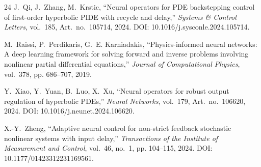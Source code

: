 \documentclass[11pt]{article}
\begin{document}
\begin{thebibliography}{24}
J.~Qi, J.~Zhang, M.~Krstic,
``Neural operators for PDE backstepping control of first-order hyperbolic
PIDE with recycle and delay,''
\emph{Systems \& Control Letters}, vol.~185, Art.\ no.\ 105714, 2024.
DOI: 10.1016/j.sysconle.2024.105714.

M.~Raissi, P.~Perdikaris, G.~E. Karniadakis,
``Physics-informed neural networks: A deep learning framework for solving
forward and inverse problems involving nonlinear partial differential
equations,''
\emph{Journal of Computational Physics}, vol.~378, pp. 686--707, 2019.

Y.~Xiao, Y.~Yuan, B.~Luo, X.~Xu,
``Neural operators for robust output regulation of hyperbolic PDEs,''
\emph{Neural Networks}, vol.~179, Art.\ no.\ 106620, 2024.
DOI: 10.1016/j.neunet.2024.106620.

X.-Y.~Zheng,
``Adaptive neural control for non-strict feedback stochastic nonlinear
systems with input delay,''
\emph{Transactions of the Institute of Measurement and Control},
vol.~46, no.~1, pp. 104--115, 2024. DOI: 10.1177/01423312231169561.

\end{thebibliography}
\end{document}
